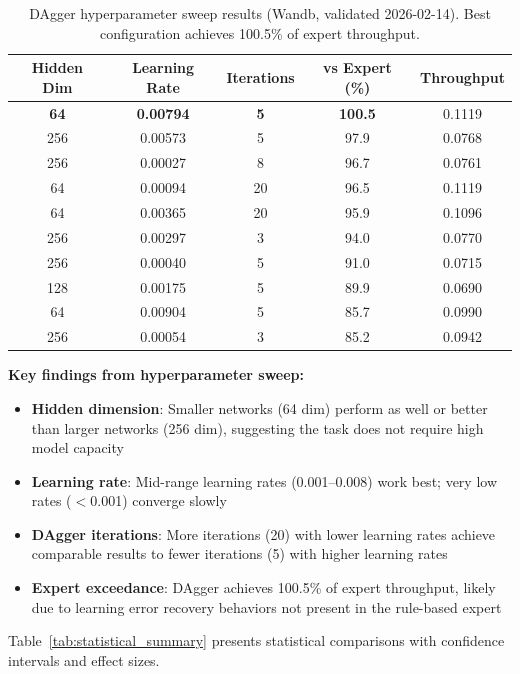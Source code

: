 \documentclass[11pt,a4paper]{article}
\begin{document}
\begin{table}[h]
\centering
\caption{DAgger hyperparameter sweep results (Wandb, validated 2026-02-14). Best configuration achieves 100.5\% of expert throughput.}
\label{tab:dagger_sweep}
\begin{tabular}{ccccc}
\toprule
Hidden Dim & Learning Rate & Iterations & vs Expert (\%) & Throughput \\
\midrule
\textbf{64} & \textbf{0.00794} & \textbf{5} & \textbf{100.5} & 0.1119 \\
256 & 0.00573 & 5 & 97.9 & 0.0768 \\
256 & 0.00027 & 8 & 96.7 & 0.0761 \\
64 & 0.00094 & 20 & 96.5 & 0.1119 \\
64 & 0.00365 & 20 & 95.9 & 0.1096 \\
256 & 0.00297 & 3 & 94.0 & 0.0770 \\
256 & 0.00040 & 5 & 91.0 & 0.0715 \\
128 & 0.00175 & 5 & 89.9 & 0.0690 \\
64 & 0.00904 & 5 & 85.7 & 0.0990 \\
256 & 0.00054 & 3 & 85.2 & 0.0942 \\
\bottomrule
\end{tabular}
\end{table}

\textbf{Key findings from hyperparameter sweep:}
\begin{itemize}
    \item \textbf{Hidden dimension}: Smaller networks (64 dim) perform as well or better than larger networks (256 dim), suggesting the task does not require high model capacity
    \item \textbf{Learning rate}: Mid-range learning rates (0.001--0.008) work best; very low rates ($<$0.001) converge slowly
    \item \textbf{DAgger iterations}: More iterations (20) with lower learning rates achieve comparable results to fewer iterations (5) with higher learning rates
    \item \textbf{Expert exceedance}: DAgger achieves 100.5\% of expert throughput, likely due to learning error recovery behaviors not present in the rule-based expert
\end{itemize}

Table~\ref{tab:statistical_summary} presents statistical comparisons with confidence intervals and effect sizes.
\end{document}
